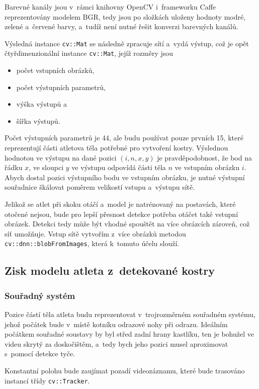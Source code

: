 Barevné kanály jsou v~rámci knihovny OpenCV i~frameworku Caffe reprezentovány modelem BGR, tedy jsou po složkách uloženy hodnoty modré, zelené a~červené barvy, a~tudíž není nutné řešit konverzi barevných kanálů.

Výsledná instance \texttt{cv::Mat} se následně zpracuje sítí a~vydá výstup, což je opět čtyřdimenzionální instance \texttt{cv::Mat}, jejíž rozměry jsou
\begin{itemize}
\item počet vstupních obrázků,
\item počet výstupních parametrů,
\item výška výstupů a
\item šířka výstupů.
\end{itemize}
Počet výstupních parametrů je 44, ale budu používat pouze prvních 15, které reprezentují části atletova těla potřebné pro vytvoření kostry. Výslednou hodnotou ve výstupu na dané pozici $(i,n,x,y)$ je pravděpodobnost, že bod na řádku $x$, ve sloupci $y$ ve výstupu odpovídá části těla $n$ ve vstupním obrázku $i$. Abych dostal pozici výstupního bodu ve vstupním obrázku, je nutné výstupní souřadnice škálovat poměrem velikostí vstupu a~výstupu sítě.

Jelikož se atlet při skoku otáčí a~model je natrénovaný na postavách, které otočené nejsou, bude pro lepší přesnost detekce potřeba otáčet také vstupní obrázek. Detekci tedy může být vhodné spouštět na více obrázcích zároveň, což síť umožňuje. Vstup sítě vytvořím z~více obrázků metodou \texttt{cv::dnn::blobFromImages}, která k~tomuto účelu slouží.

\subsection{Zisk modelu atleta z~detekované kostry}

\subsubsection{Souřadný systém}

Pozice částí těla atleta budu reprezentovat v~trojrozměrném souřadném systému, jehož počátek bude v~místě kotníku odrazové nohy při odrazu. Ideálním počátkem souřadné soustavy by byl střed zadní hrany kastlíku, ten je bohužel ve videu skrytý za doskočištěm, a~tedy bych jeho pozici musel aproximovat s~pomocí detekce tyče.

Konstantní polohu bude zaujímat pozadí videozáznamu, které bude trasováno instancí třídy \texttt{cv::Tracker}.

